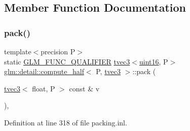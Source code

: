 \subsection{Member Function Documentation}
\mbox{\label{structglm_1_1detail_1_1compute__half_3_01_p_00_01tvec3_01_4_a329d076df25a395e8d4872384ca17221}} 
\subsubsection{\texorpdfstring{pack()}{pack()}}
{\footnotesize\ttfamily template$<$precision P$>$ \\
static \mbox{\hyperlink{setup_8hpp_a33fdea6f91c5f834105f7415e2a64407}{G\+L\+M\+\_\+\+F\+U\+N\+C\+\_\+\+Q\+U\+A\+L\+I\+F\+I\+ER}} \mbox{\hyperlink{structglm_1_1tvec3}{tvec3}}$<$\mbox{\hyperlink{namespaceglm_1_1detail_a47b2a7d006d187338e8031a352d1ce56}{uint16}}, P$>$ \mbox{\hyperlink{structglm_1_1detail_1_1compute__half}{glm\+::detail\+::compute\+\_\+half}}$<$ P, \mbox{\hyperlink{structglm_1_1tvec3}{tvec3}} $>$\+::pack (\begin{DoxyParamCaption}\item[{\mbox{\hyperlink{structglm_1_1tvec3}{tvec3}}$<$ float, P $>$ const \&}]{v }\end{DoxyParamCaption})\hspace{0.3cm}{\ttfamily [inline]}, {\ttfamily [static]}}



Definition at line 318 of file packing.\+inl.

\mbox{\label{structglm_1_1detail_1_1compute__half_3_01_p_00_01tvec3_01_4_a48226a2ef3176a5fbf6bbad330180517}} 
